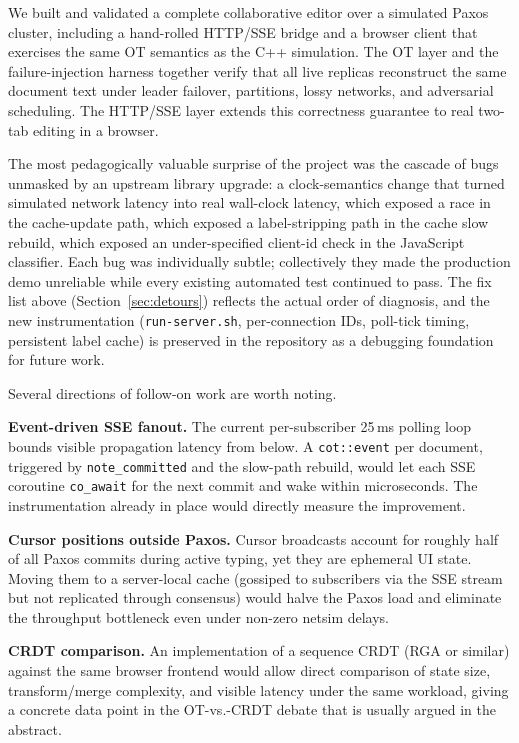 \documentclass[11pt]{article}
\newcommand{\code}[1]{\texttt{#1}}
\begin{document}
We built and validated a complete collaborative editor over a simulated Paxos cluster, including a hand-rolled HTTP/SSE bridge and a browser client that exercises the same OT semantics as the C++ simulation. The OT layer and the failure-injection harness together verify that all live replicas reconstruct the same document text under leader failover, partitions, lossy networks, and adversarial scheduling. The HTTP/SSE layer extends this correctness guarantee to real two-tab editing in a browser.

The most pedagogically valuable surprise of the project was the cascade of bugs unmasked by an upstream library upgrade: a clock-semantics change that turned simulated network latency into real wall-clock latency, which exposed a race in the cache-update path, which exposed a label-stripping path in the cache slow rebuild, which exposed an under-specified client-id check in the JavaScript classifier. Each bug was individually subtle; collectively they made the production demo unreliable while every existing automated test continued to pass. The fix list above (Section~\ref{sec:detours}) reflects the actual order of diagnosis, and the new instrumentation (\code{run-server.sh}, per-connection IDs, poll-tick timing, persistent label cache) is preserved in the repository as a debugging foundation for future work.

Several directions of follow-on work are worth noting.

\textbf{Event-driven SSE fanout.} The current per-subscriber 25\,ms polling loop bounds visible propagation latency from below. A \code{cot::event} per document, triggered by \code{note\_committed} and the slow-path rebuild, would let each SSE coroutine \code{co\_await} for the next commit and wake within microseconds. The instrumentation already in place would directly measure the improvement.

\textbf{Cursor positions outside Paxos.} Cursor broadcasts account for roughly half of all Paxos commits during active typing, yet they are ephemeral UI state. Moving them to a server-local cache (gossiped to subscribers via the SSE stream but not replicated through consensus) would halve the Paxos load and eliminate the throughput bottleneck even under non-zero netsim delays.

\textbf{CRDT comparison.} An implementation of a sequence CRDT (RGA or similar) against the same browser frontend would allow direct comparison of state size, transform/merge complexity, and visible latency under the same workload, giving a concrete data point in the OT-vs.-CRDT debate that is usually argued in the abstract.
\end{document}
